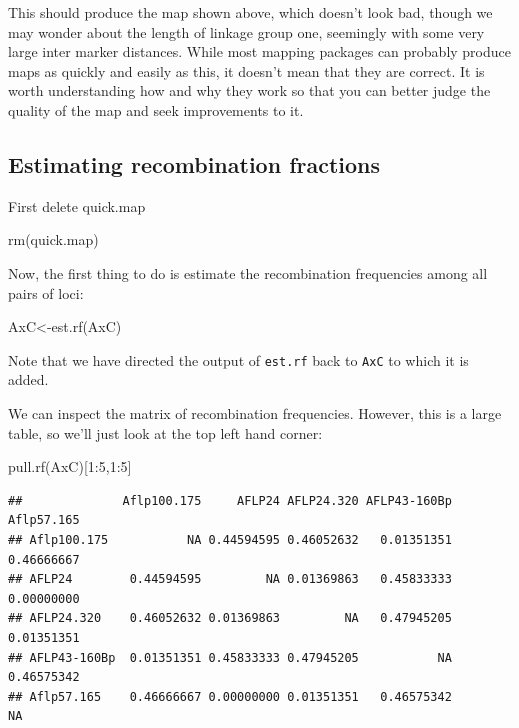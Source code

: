 \documentclass[
]{book}
\newenvironment{Shaded}{\begin{snugshade}}{\end{snugshade}}
\newcommand{\DecValTok}[1]{\textcolor[rgb]{0.00,0.00,0.81}{#1}}
\newcommand{\FunctionTok}[1]{\textcolor[rgb]{0.00,0.00,0.00}{#1}}
\newcommand{\NormalTok}[1]{#1}
\newcommand{\OtherTok}[1]{\textcolor[rgb]{0.56,0.35,0.01}{#1}}
\newcommand{\SpecialCharTok}[1]{\textcolor[rgb]{0.00,0.00,0.00}{#1}}
\begin{document}
This should produce the map shown above, which doesn't look bad, though we may wonder about the length of linkage group one, seemingly with some very large inter marker distances. While most mapping packages can probably produce maps as quickly and easily as this, it doesn't mean that they are correct. It is worth understanding how and why they work so that you can better judge the quality of the map and seek improvements to it.

\hypertarget{estimating-recombination-fractions}{%
\subsection{Estimating recombination fractions}\label{estimating-recombination-fractions}}

First delete quick.map

\begin{Shaded}
\begin{Highlighting}[]
\FunctionTok{rm}\NormalTok{(quick.map) }
\end{Highlighting}
\end{Shaded}

Now, the first thing to do is estimate the recombination frequencies among all pairs of loci:

\begin{Shaded}
\begin{Highlighting}[]
\NormalTok{AxC}\OtherTok{\textless{}{-}}\FunctionTok{est.rf}\NormalTok{(AxC) }
\end{Highlighting}
\end{Shaded}

Note that we have directed the output of \texttt{est.rf} back to \texttt{AxC} to which it is added.

We can inspect the matrix of recombination frequencies. However, this is a large table, so we'll just look at the top left hand corner:

\begin{Shaded}
\begin{Highlighting}[]
\FunctionTok{pull.rf}\NormalTok{(AxC)[}\DecValTok{1}\SpecialCharTok{:}\DecValTok{5}\NormalTok{,}\DecValTok{1}\SpecialCharTok{:}\DecValTok{5}\NormalTok{] }
\end{Highlighting}
\end{Shaded}

\begin{verbatim}
##              Aflp100.175     AFLP24 AFLP24.320 AFLP43-160Bp Aflp57.165
## Aflp100.175           NA 0.44594595 0.46052632   0.01351351 0.46666667
## AFLP24        0.44594595         NA 0.01369863   0.45833333 0.00000000
## AFLP24.320    0.46052632 0.01369863         NA   0.47945205 0.01351351
## AFLP43-160Bp  0.01351351 0.45833333 0.47945205           NA 0.46575342
## Aflp57.165    0.46666667 0.00000000 0.01351351   0.46575342         NA
\end{verbatim}
\end{document}
